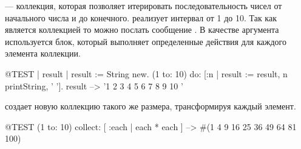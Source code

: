 \documentclass[a4paper,10pt,twoside]{book}
\begin{document}

 --- коллекция, которая позволяет итерировать последовательность чисел от начального числа и до конечного.
 реализует интервал от 1 до 10.
Так как  является коллекцией то можно послать сообщение .
В качестве аргумента используется блок, который выполняет определенные действия для каждого элемента коллекции.

\begin{code}{@TEST | result |}
result := String new.
(1 to: 10) do: [:n | result := result, n printString, ' '].
result --> '1 2 3 4 5 6 7 8 9 10 '
\end{code}



 создает новую коллекцию такого же размера, трансформируя каждый элемент.

\begin{code}{@TEST}
(1 to: 10) collect: [ :each | each * each ] --> #(1 4 9 16 25 36 49 64 81 100)
\end{code}

\end{document}
